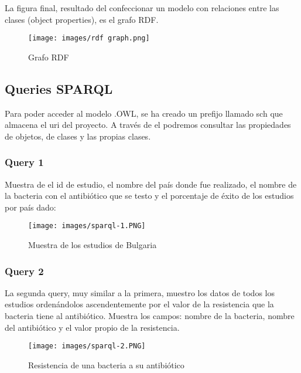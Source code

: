 \documentclass[../main.tex]{subfiles}
\begin{document}
La figura final, resultado del confeccionar un modelo con relaciones entre las clases (object properties), es el grafo RDF. 
\begin{figure}[ht]
    \centering
    \texttt{[image: images/rdf graph.png]}
    \caption{Grafo RDF}
    \label{rdf graph}
\end{figure}

\subsection{Queries SPARQL}

Para poder acceder al modelo .OWL, se ha creado un prefijo llamado sch que almacena el uri del proyecto. A través de el podremos consultar las propiedades de objetos, de clases y las propias clases.

\subsubsection{Query 1}

Muestra de el id de estudio, el nombre del país donde fue realizado, el nombre de la bacteria con el antibiótico que se testo y el porcentaje de éxito de los estudios por país dado:

\begin{figure}[ht]
    \centering
    \texttt{[image: images/sparql-1.PNG]}
    \caption{Muestra de los estudios de Bulgaria}
    \label{spark1}
\end{figure}

 

\subsubsection{Query 2}

La segunda query, muy similar a la primera, muestro los datos de todos los estudios ordenándolos ascendentemente por el valor de la resistencia que la bacteria tiene al antibiótico. Muestra los campos: nombre de la bacteria, nombre del antibiótico y el valor propio de la resistencia. 


\begin{figure}[ht]
    \centering
    \texttt{[image: images/sparql-2.PNG]}
    \caption{Resistencia de una bacteria a su antibiótico}
    \label{spark2}
\end{figure}
\end{document}
